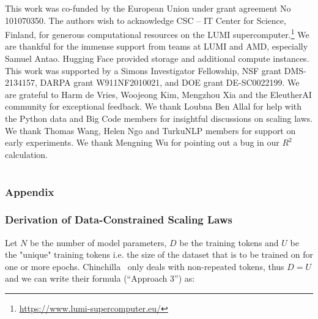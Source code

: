 \documentclass{article}
\begin{document}
\begin{ack}

This work was co-funded by the European Union under grant agreement No 101070350. The authors wish to acknowledge CSC – IT Center for Science, Finland, for generous computational resources on the LUMI supercomputer.\footnote{\url{https://www.lumi-supercomputer.eu/}} We are thankful for the immense support from teams at LUMI and AMD, especially Samuel Antao. Hugging Face provided storage and additional compute instances. This work was supported by a Simons Investigator Fellowship, NSF grant DMS-2134157, DARPA grant W911NF2010021, and DOE grant DE-SC0022199. We are grateful to Harm de Vries, Woojeong Kim, Mengzhou Xia and the EleutherAI community for exceptional feedback. We thank Loubna Ben Allal for help with the Python data and Big Code members for insightful discussions on scaling laws. We thank Thomas Wang, Helen Ngo and TurkuNLP members for support on early experiments. We thank Mengning Wu for pointing out a bug in our $R^2$ calculation.

\end{ack}


% 



\newpage
\appendix


\part{}
\section*{\centering \LARGE{Appendix}}
\parttoc

\clearpage

\section{Derivation of Data-Constrained Scaling Laws}
\label{sec:scalinglaws}

Let $N$ be the number of model parameters, $D$ be the training tokens and $U$ be the "unique" training tokens i.e. the size of the dataset that is to be trained on for one or more epochs. Chinchilla~\cite{hoffmann2022training} only deals with non-repeated tokens, thus $D=U$ and we can write their formula  (``Approach 3'') as:
\end{document}
